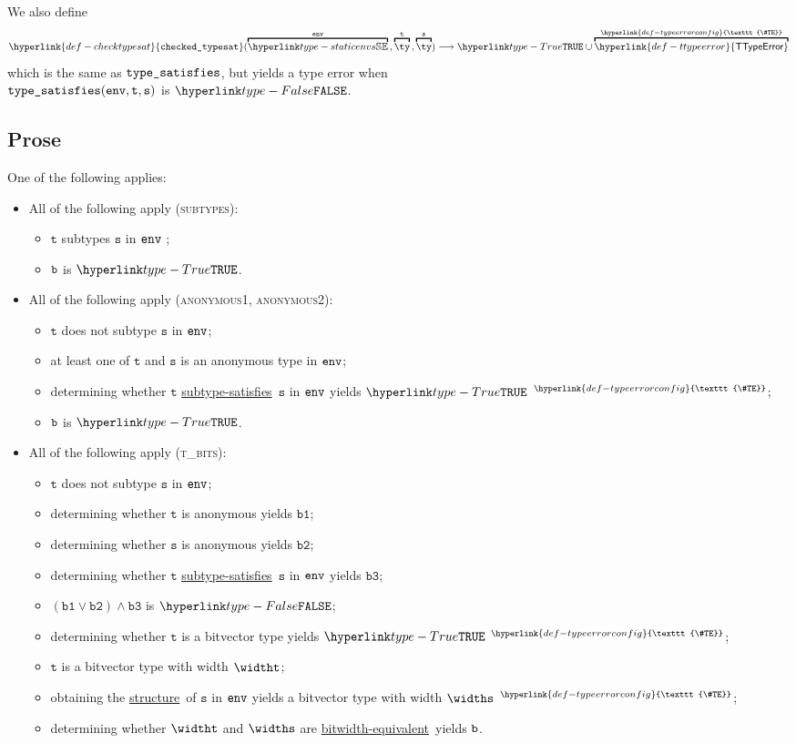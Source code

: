 \documentclass{book}
\newcommand\TTypeError[0]{\hyperlink{def-ttypeerror}{\textsf{TTypeError}}}
\newcommand\TypeErrorConfig[0]{\hyperlink{def-typeerrorconfig}{\texttt{\#TE}}}
\newcommand\ProseOrTypeError[0]{\hyperlink{def-proseortypeerror}{$^{\TypeErrorConfig}$}}
\newcommand\checktypesat[0]{\hyperlink{def-checktypesat}{\texttt{checked\_typesat}}}
\newcommand\structure[0]{\hyperlink{def-structure}{structure}}
\newcommand\subtypesatisfies[0]{\hyperlink{def-subtypesatisfies}{subtype-satisfies}}
\newcommand\bitwidthequivalent[0]{\hyperlink{def-bitwidthequal}{bitwidth-equivalent}}
\newcommand\vt[0]{\texttt{t}}
\newcommand\vs[0]{\texttt{s}}
\newcommand\vbone[0]{\texttt{b1}}
\newcommand\vbtwo[0]{\texttt{b2}}
\newcommand\vbthree[0]{\texttt{b3}}
\begin{document}
\hypertarget{def-checktypesat}{}
We also define
\[
  \checktypesat(\overname{\staticenvs}{\tenv} \aslsep \overname{\ty}{\vt} \aslsep \overname{\ty}{\vs})
  \aslto \True \cup \overname{\TTypeError}{\TypeErrorConfig}
\]
which is the same as $\texttt{type\_satisfies}$, but yields a type error when \\ $\typesat(\tenv, \vt, \vs)$ is $\False$.

\subsection{Prose}
One of the following applies:
 \begin{itemize}
  \item All of the following apply (\textsc{subtypes}):
    \begin{itemize}
    \item $\vt$ subtypes $\vs$ in $\texttt{env}$ ;
    \item $\texttt{b}$ is $\True$.
  \end{itemize}

  \item All of the following apply (\textsc{anonymous1}, \textsc{anonymous2}):
  \begin{itemize}
    \item $\vt$ does not subtype $\vs$ in $\texttt{env}$;
    \item at least one of $\vt$ and $\vs$ is an anonymous type in $\texttt{env}$;
    \item determining whether $\vt$ \subtypesatisfies\ $\vs$ in $\texttt{env}$ yields $\True$ \ProseOrTypeError;
    \item $\texttt{b}$ is $\True$.
  \end{itemize}

  \item All of the following apply (\textsc{t\_bits}):
  \begin{itemize}
    \item $\vt$ does not subtype $\vs$ in $\texttt{env}$;
    \item determining whether $\vt$ is anonymous yields $\vbone$;
    \item determining whether $\vs$ is anonymous yields $\vbtwo$;
    \item determining whether $\vt$ \subtypesatisfies\ $\vs$ in $\texttt{env}$ yields $\vbthree$;
    \item $(\vbone \lor \vbtwo) \land \vbthree$ is $\False$;
    \item determining whether $\vt$ is a bitvector type yields $\True$ \ProseOrTypeError;
    \item $\vt$ is a bitvector type with width $\widtht$;
    \item obtaining the \structure\ of $\vs$ in $\texttt{env}$ yields a bitvector type with width $\widths$ \ProseOrTypeError;
    \item determining whether $\widtht$ and $\widths$ are \bitwidthequivalent\ yields $\texttt{b}$.
  \end{itemize}


\end{itemize}
\end{document}

